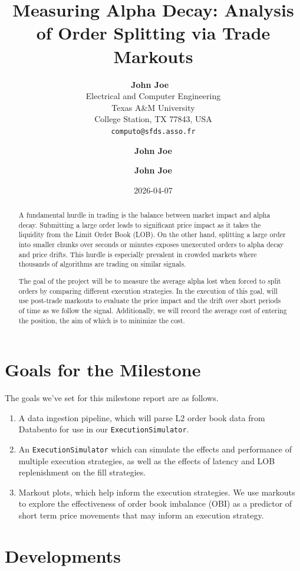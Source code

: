 \documentclass[
  letterpaper,
]{article}
\title{Measuring Alpha Decay: Analysis of Order Splitting via Trade
Markouts}
\author{
\textbf{John Joe}%
~\orcidlink{0000-0000-0000-0000}\\%
%
    Electrical and Computer Engineering\\%
    Texas A\&M University\\%
    College Station, TX 77843, USA\\%
%
\texttt{computo@sfds.asso.fr}\and 
\textbf{John Joe}%
\\%
%
\and 
\textbf{John Joe}%
\\%
%
}
\date{2026-04-07}
\providecommand{\tightlist}{%
  \setlength{\itemsep}{0pt}\setlength{\parskip}{0pt}}
\begin{document}
\maketitle
\begin{abstract}
A fundamental hurdle in trading is the balance between market impact and
alpha decay. Submitting a large order leads to significant price impact
as it takes the liquidity from the Limit Order Book (LOB). On the other
hand, splitting a large order into smaller chunks over seconds or
minutes exposes unexecuted orders to alpha decay and price drifts. This
hurdle is especially prevalent in crowded markets where thousands of
algorithms are trading on similar signals.

The goal of the project will be to measure the average alpha lost when
forced to split orders by comparing different execution strategies. In
the execution of this goal, will use post-trade markouts to evaluate the
price impact and the drift over short periods of time as we follow the
signal. Additionally, we will record the average cost of entering the
position, the aim of which is to minimize the cost.
\end{abstract}


\section{Goals for the Milestone}\label{goals-for-the-milestone}

The goals we've set for this milestone report are as follows.

\begin{enumerate}
\def\labelenumi{\arabic{enumi}.}
\tightlist
\item
  A data ingestion pipeline, which will parse L2 order book data from
  Databento for use in our \texttt{ExecutionSimulator}.
\item
  An \texttt{ExecutionSimulator} which can simulate the effects and
  performance of multiple execution strategies, as well as the effects
  of latency and LOB replenishment on the fill strategies.
\item
  Markout plots, which help inform the execution strategies. We use
  markouts to explore the effectiveness of order book imbalance (OBI) as
  a predictor of short term price movements that may inform an execution
  strategy.
\end{enumerate}

\section{Developments}\label{developments}
\end{document}
